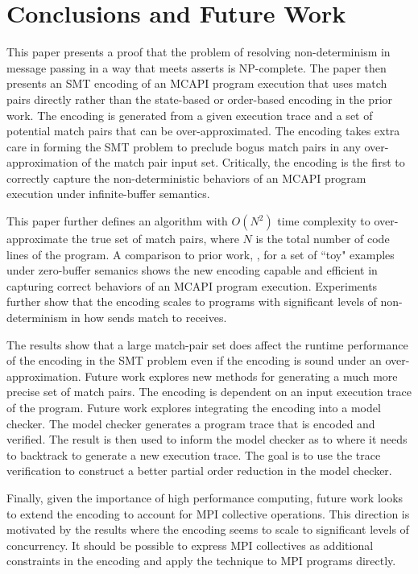 \section{Conclusions and Future Work}
This paper presents a proof that the problem of resolving
non-determinism in message passing in a way that meets asserts is
NP-complete. The paper then presents an SMT encoding of an MCAPI
program execution that uses match pairs directly rather than the
state-based or order-based encoding in the prior work. The encoding is
generated from a given execution trace and a set of potential match
pairs that can be over-approximated. The encoding takes extra care in
forming the SMT problem to preclude bogus match pairs in any
over-approximation of the match pair input set. Critically, the
encoding is the first to correctly capture the non-deterministic
behaviors of an MCAPI program execution under infinite-buffer
semantics.

This paper further defines an algorithm with $O(N^2)$ time complexity
to over-approximate the true set of match pairs, where $N$ is the
total number of code lines of the program. A comparison to prior work,
\cite{elwakil:padtad10}, for a set of ``toy" examples under
zero-buffer semanics shows the new encoding capable and efficient in
capturing correct behaviors of an MCAPI program execution. Experiments
further show that the encoding scales to programs with significant levels of
non-determinism in how sends match to receives.

The results show that a large match-pair set does affect the runtime
performance of the encoding in the SMT problem even if the encoding is
sound under an over-approximation. Future work explores new methods
for generating a much more precise set of match pairs. The encoding is
dependent on an input execution trace of the program. Future work
explores integrating the encoding into a model checker. The model
checker generates a program trace that is encoded and verified. The
result is then used to inform the model checker as to where it needs
to backtrack to generate a new execution trace. The goal is to use the
trace verification to construct a better partial order reduction in
the model checker.

Finally, given the importance of high performance computing, future
work looks to extend the encoding to account for MPI collective
operations. This direction is motivated by the results where the
encoding seems to scale to significant levels of concurrency. It
should be possible to express MPI collectives as additional
constraints in the encoding and apply the technique to MPI programs
directly.
